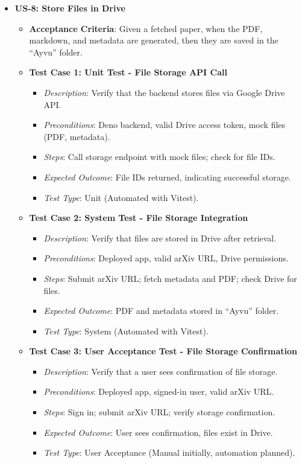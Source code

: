\documentclass[12pt]{article}
\begin{document}
\begin{itemize}
  \item \textbf{US-8: Store Files in Drive}
    \begin{itemize}
      \item \textbf{Acceptance Criteria}: Given a fetched paper, when the PDF, markdown, and metadata are generated, then they are saved in the ``Ayvu'' folder.
      \item \textbf{Test Case 1: Unit Test - File Storage API Call}
        \begin{itemize}
          \item \textit{Description}: Verify that the backend stores files via Google Drive API.
          \item \textit{Preconditions}: Deno backend, valid Drive access token, mock files (PDF, metadata).
          \item \textit{Steps}: Call storage endpoint with mock files; check for file IDs.
          \item \textit{Expected Outcome}: File IDs returned, indicating successful storage.
          \item \textit{Test Type}: Unit (Automated with Vitest).
        \end{itemize}
      \item \textbf{Test Case 2: System Test - File Storage Integration}
        \begin{itemize}
          \item \textit{Description}: Verify that files are stored in Drive after retrieval.
          \item \textit{Preconditions}: Deployed app, valid arXiv URL, Drive permissions.
          \item \textit{Steps}: Submit arXiv URL; fetch metadata and PDF; check Drive for files.
          \item \textit{Expected Outcome}: PDF and metadata stored in ``Ayvu'' folder.
          \item \textit{Test Type}: System (Automated with Vitest).
        \end{itemize}
      \item \textbf{Test Case 3: User Acceptance Test - File Storage Confirmation}
        \begin{itemize}
          \item \textit{Description}: Verify that a user sees confirmation of file storage.
          \item \textit{Preconditions}: Deployed app, signed-in user, valid arXiv URL.
          \item \textit{Steps}: Sign in; submit arXiv URL; verify storage confirmation.
          \item \textit{Expected Outcome}: User sees confirmation, files exist in Drive.
          \item \textit{Test Type}: User Acceptance (Manual initially, automation planned).
        \end{itemize}
    \end{itemize}
\end{itemize}
\end{document}
